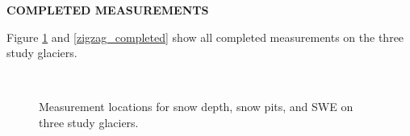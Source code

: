 \documentclass[12pt]{article}
\begin{document}
\vspace{4mm}
\noindent \textbf{COMPLETED MEASUREMENTS}

Figure \ref{transect_completed} and \ref{zigzag_completed} show all completed measurements on the three study glaciers. 


\begin{landscape}
\begin{figure}
	\centering
	\\
	\caption{Measurement locations for snow depth, snow pits, and SWE on three study glaciers.}
	\label{transect_completed}
\end{figure}


\end{landscape}
\end{document}
